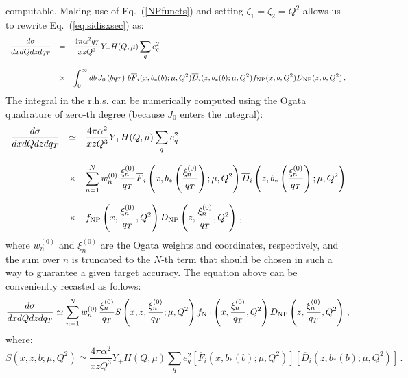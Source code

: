 \documentclass[10pt,a4paper]{article}
\begin{document}
computable. Making use of Eq.~(\ref{NPfuncts}) and setting
$\zeta_1=\zeta_2=Q^2$ allows us to rewrite Eq.~(\ref{eq:sidisxsec})
as:
\begin{equation}\label{eq:sidisxsec3}
\begin{array}{rcl}
\displaystyle   \frac{d\sigma}{dxdQdz d q_{T}} &=&\displaystyle
\frac{4\pi \alpha^2q_{T}}{xzQ^3}Y_+ H(Q,\mu) \sum_q e_q^2\\
\\
&\times&\displaystyle 
  \int_0^\infty db\, J_0\left(bq_T\right) \,b\overline{F}_i(x,b_*(b);\mu,Q^2) \overline{D}_i(z,b_*(b);\mu,Q^2) f_{\rm NP}(x,b,Q^2) D_{\rm NP}(z,b,Q^2)\,.
\end{array}
\end{equation}
The integral in the r.h.s. can be numerically computed using the Ogata
quadrature of zero-th degree (because $J_0$ enters the integral):
\begin{equation}
\begin{array}{rcl}
\displaystyle   \frac{d\sigma}{dxdQdz d q_{T}} &\simeq&\displaystyle
\frac{4\pi \alpha^2}{xzQ^3}Y_+ H(Q,\mu) \sum_q e_q^2\\
\\
&\times&\displaystyle
  \sum_{n=1}^{N}w_n^{(0)}\,\frac{\xi_n^{(0)}}{q_{T}}\overline{F}_i\left(x,b_*\left(\frac{\xi_n^{(0)}}{q_{T}}\right);\mu,Q^2\right)
         \overline{D}_i\left(z,b_*\left(\frac{\xi_n^{(0)}}{q_{T}}\right);\mu,Q^2\right)\\
\\
&\times& \displaystyle f_{\rm NP}\left(x, \frac{\xi_n^{(0)}}{q_{T}},Q^2\right) D_{\rm NP}\left(z, \frac{\xi_n^{(0)}}{q_{T}},Q^2\right)\,,
\end{array}
\end{equation}
where $w_n^{(0)}$ and $\xi_n^{(0)}$ are the Ogata weights and
coordinates, respectively, and the sum over $n$ is truncated to the
$N$-th term that should be chosen in such a way to guarantee a given
target accuracy. The equation above can be conveniently recasted as
follows:
\begin{equation}
\displaystyle \frac{d\sigma}{dxdQdz d q_{T}} \simeq
  \sum_{n=1}^{N}w_n^{(0)}\,\frac{\xi_n^{(0)}}{q_{T}}S\left(x,z,\frac{\xi_n^{(0)}}{q_{T}};\mu,Q^2\right) f_{\rm NP}\left(x, \frac{\xi_n^{(0)}}{q_{T}},Q^2\right) D_{\rm NP}\left(z, \frac{\xi_n^{(0)}}{q_{T}},Q^2\right)\,,
\end{equation}
where:
\begin{equation}\label{eq:Sall}
\displaystyle S\left(x,z,b;\mu,Q^2\right)\simeq
\frac{4\pi \alpha^2}{xzQ^3}Y_+ H(Q,\mu) \sum_q e_q^2 \left[\overline{F}_i\left(x,b_*(b);\mu,Q^2\right)\right]\left[\overline{D}_i\left(z,b_*(b);\mu,Q^2\right)\right]\,.
\end{equation}
\end{document}
